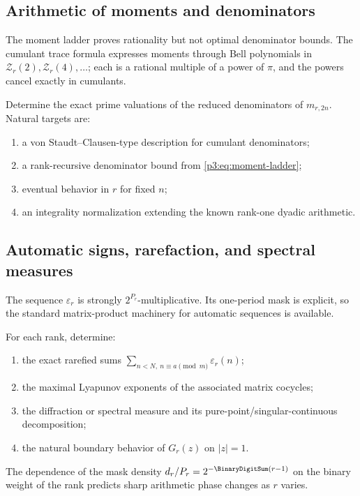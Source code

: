 \documentclass[11pt,oneside]{article}
\theoremstyle{definition}
\theoremstyle{remark}
\begin{document}
\subsection{Arithmetic of moments and denominators}

The moment ladder proves rationality but not optimal denominator bounds.  The cumulant trace formula expresses moments through Bell polynomials in
$\mathcal Z_r(2),\mathcal Z_r(4),\ldots$; each is a rational multiple of a power of $\pi$, and the powers cancel exactly in cumulants.

\begin{frontierproblem}
Determine the exact prime valuations of the reduced denominators of
$m_{r,2n}$.  Natural targets are:
\begin{enumerate}[label=(\roman*)]
\item a von Staudt--Clausen-type description for cumulant denominators;
\item a rank-recursive denominator bound from \eqref{p3:eq:moment-ladder};
\item eventual behavior in $r$ for fixed $n$;
\item an integrality normalization extending the known rank-one dyadic arithmetic.
\end{enumerate}
\end{frontierproblem}

\subsection{Automatic signs, rarefaction, and spectral measures}

The sequence $\varepsilon_r$ is strongly $2^{P_r}$-multiplicative.  Its one-period mask is explicit, so the standard matrix-product machinery for automatic sequences is available.

\begin{frontierproblem}
For each rank, determine:
\begin{enumerate}[label=(\roman*)]
\item the exact rarefied sums $\sum_{n<N,\ n\equiv a\pmod m}\varepsilon_r(n)$;
\item the maximal Lyapunov exponents of the associated matrix cocycles;
\item the diffraction or spectral measure and its pure-point/singular-continuous decomposition;
\item the natural boundary behavior of $G_r(z)$ on $|z|=1$.
\end{enumerate}
The dependence of the mask density $d_r/P_r=2^{-\BinaryDigitSum(r-1)}$ on the binary weight of the rank predicts sharp arithmetic phase changes as $r$ varies.
\end{frontierproblem}
\end{document}
